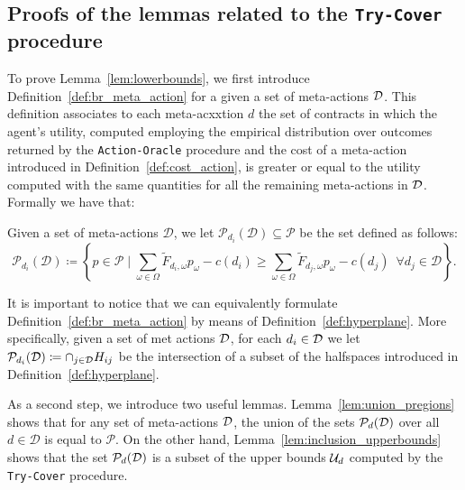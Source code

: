 \subsection{Proofs of the lemmas related to the \texttt{Try-Cover} procedure}\label{sec:app_try_partiton}

To prove Lemma~\ref{lem:lowerbounds}, we first introduce Definition~\ref{def:br_meta_action} for a given a set of meta-actions $\mathcal{D}$. This definition associates to each meta-acxxtion $d$ the set of contracts in which the agent's utility, computed employing the empirical distribution over outcomes returned by the \texttt{Action-Oracle} procedure and the cost of a meta-action introduced in Definition~\ref{def:cost_action}, is greater or equal to the utility computed with the same quantities for all the remaining meta-actions in $\mathcal{D}$. Formally we have that:
\begin{definition}\label{def:br_meta_action}
Given a set of meta-actions $\mathcal{D}$, we let $\mathcal{P}_{d_i} (\mathcal{D}) \subseteq \mathcal{P}$ be the set defined as follows:
\begin{equation*}
	\mathcal{P}_{d_i} (\mathcal{D}) \coloneqq \left \{ p \in \mathcal{P} \mid \sum_{\omega \in \Omega}\widetilde{F}_{d_i,\omega}p_{\omega} - c({d_i}) \ge  \sum_{\omega \in \Omega}\widetilde{F}_{d_j,\omega}p_{\omega} - c({d_j})  \,\,\, \forall d_j \in \mathcal{D}\right \}.
\end{equation*}
\end{definition}

It is important to notice that we can equivalently formulate Definition~\ref{def:br_meta_action} by means of Definition~\ref{def:hyperplane}. More specifically, given a set of met actions $\mathcal{D}$, for each $d_i \in \mathcal{D}$ we let $\mathcal{P}_{d_i} (\mathcal{D}) \coloneqq \cap_{j \in \mathcal{D}} H_{ij}$ be the intersection of a subset of the halfspaces introduced in Definition~\ref{def:hyperplane}.

As a second step, we introduce two useful lemmas. Lemma~\ref{lem:union_pregions} shows that for any set of meta-actions $\mathcal{D}$, the union of the sets $\mathcal{P}_d(\mathcal{D})$ over all $d \in \mathcal{D}$ is equal to $\mathcal{P}$. On the other hand, Lemma~\ref{lem:inclusion_upperbounds} shows that the set $\mathcal{P}_d(\mathcal{D})$ is a subset of the upper bounds $\mathcal{U}_d$ computed by the \texttt{Try-Cover} procedure. 

